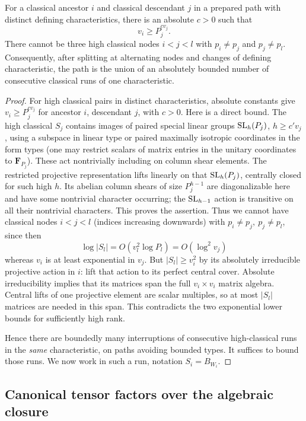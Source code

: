 \begin{lemma}\label{w:characteristic-switch}
For a classical ancestor $i$ and classical descendant $j$ in a prepared path with distinct defining characteristics, there is an absolute $c>0$ such that
\[
 v_i\ge P_j^{c v_j}.
\]
There cannot be three high classical nodes $i<j<l$ with $p_i\ne p_j$ and $p_j\ne p_l$. Consequently, after splitting at alternating nodes and changes of defining characteristic, the path is the union of an absolutely bounded number of consecutive classical runs of one characteristic.
\end{lemma}
\begin{proof}
For high classical pairs in distinct characteristics, absolute constants give \(v_i\ge P_j^{c v_j}\) for ancestor \(i\), descendant \(j\), with \(c>0\). Here is a direct bound. The high classical \(S_j\) contains images of paired special linear groups \({\rm SL}_h(P_j)\), \(h\ge c' v_j\), using a subspace in linear type or paired maximally isotropic coordinates in the form types (one may restrict scalars of matrix entries in the unitary coordinates to \(\mathbf F_{P_j}\)). These act nontrivially including on column shear elements. The restricted projective representation lifts linearly on that \({\rm SL}_h(P_j)\), centrally closed for such high \(h\). Its abelian column shears of size \(P_j^{h-1}\) are diagonalizable here and have some nontrivial character occurring; the \({\rm SL}_{h-1}\) action is transitive on all their nontrivial characters. This proves the assertion. Thus we cannot have classical nodes \(i<j<l\) (indices increasing downwards) with \(p_i\ne p_j,\ p_j\ne p_l\), since then
\[
 \log|S_l|=O(v_l^2\log P_l)=O(\log^2 v_j)
\]
whereas \(v_i\) is at least exponential in \(v_j\). But \(|S_l|\ge v_i^2\) by its absolutely irreducible projective action in \(i\): lift that action to its perfect central cover. Absolute irreducibility implies that its matrices span the full $v_i\times v_i$ matrix algebra. Central lifts of one projective element are scalar multiples, so at most $|S_l|$ matrices are needed in this span. This contradicts the two exponential lower bounds for sufficiently high rank.

Hence there are boundedly many interruptions of consecutive high-classical runs in the \emph{same} characteristic, on paths avoiding bounded types. It suffices to bound those runs. We now work in such a run, notation \(S_i=B_{W_i}\).
\end{proof}

\subsection{Canonical tensor factors over the algebraic closure}

